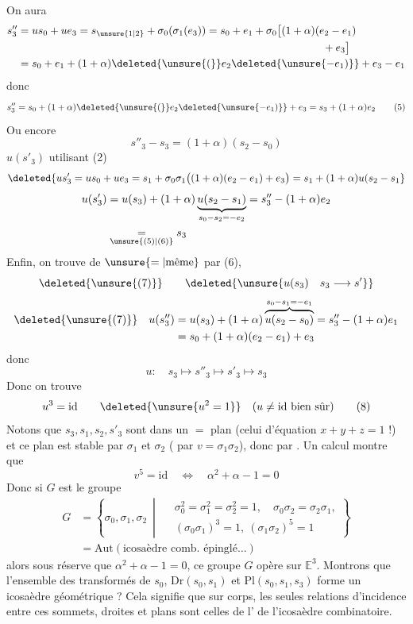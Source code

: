 On aura
\[
\begin{aligned}
s''_3&=us_0+ue_3=s_{\unsure{1|2}}+\sigma_0(\sigma_1(e_3))=s_0+e_1+\sigma_0\bigl[(1+\alpha)(e_2-e_1)\\
&\hspace{10cm}+e_3\bigr]\\
&=s_0+e_1+(1+\alpha)\deleted{\unsure{(}}e_2\deleted{\unsure{-e_1)}}+e_3-e_1
\end{aligned}
\]
donc
\[
s''_3=s_0+(1+\alpha)\deleted{\unsure{(}}e_2\deleted{\unsure{-e_1)}}+e_3=s_3+(1+\alpha)e_2\tag*{(5)}
\]
Ou encore
\[
s''_3-s_3=(1+\alpha)(s_2-s_0)\tag*{(6)}
\]
 $u(s'_3)$ utilisant (2)
\[
\deleted{us'_3=us_0+ue_3=s_1+\sigma_0\sigma_1\bigl((1+\alpha)(e_2-e_1)+e_3\bigr)=s_1+(1+\alpha)u(s_2-s_1}
\]
\[
\begin{aligned}
u(s'_3)&=u(s_3)+(1+\alpha)\underbrace{u(s_2-s_1)}_{s_0-s_2=-e_2}=s''_3-(1+\alpha)e_2\\
&\underset{\unsure{(5)|(6)}}{=}s_3
\end{aligned}
\]
 Enfin, on trouve de $\unsure{=|\text{même}}$ par (6),
\[
\deleted{\unsure{(7)}}\qquad\deleted{\unsure{u(s_3)\quad s_3\longrightarrow s'}}
\]
\[
\begin{aligned}
\deleted{\unsure{(7)}}\quad u(s''_3)&=u(s_3)+(1+\alpha)\overbrace{u(s_2-s_0)}^{s_0-s_1=-e_1}=s''_3-(1+\alpha)e_1\\
&=s_0+(1+\alpha)(e_2-e_1)+e_3
\end{aligned}
\]
donc
\[
u:\quad s_3\mapsto s''_3\mapsto s'_3\mapsto s_3\tag*{(7)}
\]
Donc on trouve
\[
u^3=\mathrm{id}\qquad\deleted{\unsure{u^2=1}}\quad(u\ne\mathrm{id}\ \text{bien sûr})\tag*{(8)}
\]
Notons que $s_3,s_1,s_2,s'_3$ sont dans un $=$ plan (celui d'équation $x+y+z=1$ !) et ce plan est stable par $\sigma_1$ et $\sigma_2$ ( par $v=\sigma_1\sigma_2$),  donc par . Un calcul  montre que
\[
v^5=\mathrm{id}\quad\Longleftrightarrow\quad\boxed{\alpha^2+\alpha-1=0}\tag*{(9)}
\]
Donc si $G$ est le groupe
\[
\begin{aligned}
G&=\left\{\sigma_0,\sigma_1,\sigma_2\ \middle|\ \begin{aligned}&\sigma_0^2=\sigma_1^2=\sigma_2^2=1,\quad\sigma_0\sigma_2=\sigma_2\sigma_1,\\&(\sigma_0\sigma_1)^3=1,\ (\sigma_1\sigma_2)^5=1\end{aligned}\right\}\\
&=\mathrm{Aut}(\text{icosaèdre comb. épinglé}\ldots)
\end{aligned}\tag*{(10)}
\]
alors sous réserve que $\alpha^2+\alpha-1=0$, ce groupe  $G$ opère  sur $\mathbb{E}^3$. Montrons que l'ensemble des transformés de $s_0$, $\mathrm{Dr}(s_0,s_1)$ et $\mathrm{Pl}(s_0,s_1,s_3)$ forme un icosaèdre géométrique ? Cela signifie que sur  corps, les seules relations d'incidence entre ces  sommets, droites et plans sont celles
de l'
de l'icosaèdre combinatoire.

